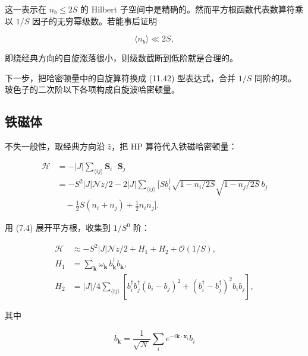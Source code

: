 这一表示在 $n_{b} \leq 2S$ 的 Hilbert 子空间中是精确的。然而平方根函数代表数算符乘以 $1/S$ 因子的无穷幂级数。若能事后证明

\begin{equation*}
\langle n _ {b} \rangle \ll 2 S ,
\tag{11.45}
\end{equation*}

即绕经典方向的自旋涨落很小，则级数截断到低阶就是合理的。

下一步，把哈密顿量中的自旋算符换成 (11.42) 型表达式，合并 $1/S$ 同阶的项。玻色子的二次阶以下各项构成自旋波哈密顿量。

\subsection{铁磁体}

不失一般性，取经典方向沿 $\hat{z}$，把 HP 算符代入铁磁哈密顿量：

\begin{align*}
\mathcal {H} & = - | J | \sum_{\langle ij \rangle} \mathbf {S} _ {i} \cdot \mathbf {S} _ {j}\\
& = - S ^ {2} | J | \mathcal {N} z / 2 - 2 | J | \sum_{\langle ij \rangle} \Big[ S b _ {i} ^ {\dagger} \sqrt {1 - n _ {i} / 2S} \sqrt {1 - n _ {j} / 2S} \, b _ {j}\\
& \quad - \frac {1}{2} S \left( n _ {i} + n _ {j} \right) + \frac {1}{2} n _ {i} n _ {j} \Big] .
\tag{11.46}
\end{align*}

用 (7.4) 展开平方根，收集到 $1/S^{0}$ 阶：

\begin{align*}
\mathcal {H} & \approx - S ^ {2} | J | \mathcal {N} z / 2 + H _ {1} + H _ {2} + \mathcal {O} ( 1/S ) ,\\
H _ {1} & = \sum_ {\mathbf {k}} \omega_ {\mathbf {k}} \, b _ {\mathbf {k}} ^ {\dagger} b _ {\mathbf {k}} ,\\
H _ {2} & = | J | / 4 \sum_{\langle ij \rangle} \left[ b _ {i} ^ {\dagger} b _ {j} ^ {\dagger} \left( b _ {i} - b _ {j} \right) ^ {2} + \left( b _ {i} ^ {\dagger} - b _ {j} ^ {\dagger} \right) ^ {2} b _ {i} b _ {j} \right] ,
\tag{11.47}
\end{align*}

其中

\begin{equation*}
b _ {\mathbf {k}} = \frac {1}{\sqrt {\mathcal {N}}} \sum_ {i} e ^ {- i \mathbf {k} \cdot \mathbf {x} _ {i}} b _ {i}
\tag{11.48}
\end{equation*}

